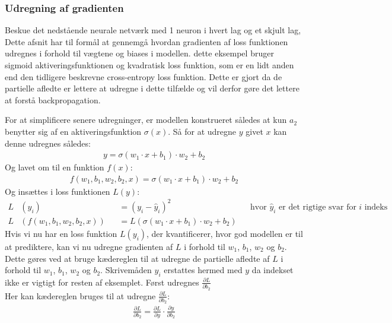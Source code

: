 \documentclass{article}
\begin{document}
\subsubsection{Udregning af gradienten}
Beskue det nedstående neurale netværk med 1 neuron i hvert lag og et skjult lag, Dette afsnit har til formål at gennemgå hvordan gradienten af loss funktionen udregnes i forhold til vægtene og biases i modellen. dette eksempel bruger sigmoid aktiveringsfunktionen og kvadratisk loss funktion, som er en lidt anden end den tidligere beskrevne cross-entropy loss funktion. Dette er gjort da de partielle afledte er lettere at udregne i dette tilfælde og vil derfor gøre det lettere at forstå backpropagation.
\begin{center}
  
  \label{fig:neural_network3}
\end{center}
For at simplificere senere udregninger, er modellen konstrueret således at kun $a_2$ benytter sig af en aktiveringsfunktion $\sigma(x)$. Så for at udregne $y$ givet $x$ kan denne udregnes således:
\begin{align}
  y= \sigma(w_1 \cdot x + b_1) \cdot w_2 + b_2  
\end{align}
Og lavet om til en funktion $f(x)$:
\begin{align}
  f(w_1, b_1, w_2, b_2, x) = \sigma(w_1 \cdot x + b_1) \cdot w_2 + b_2
\end{align}
Og insættes i loss funktionen $L(y)$:
\begin{align}
  L&(y_i) &&= (y_i - \hat{y}_i)^2 && \text{hvor } \hat{y}_i \text{ er det rigtige svar for $i$ indeks}\\
  L&(f(w_1, b_1, w_2, b_2, x)) &&= L(\sigma(w_1 \cdot x + b_1) \cdot w_2 + b_2)
  \label{eq:full_loss}
\end{align}
Hvis vi nu har en loss funktion $L(y_i)$, der kvantificerer, hvor god modellen er til at prediktere, kan vi nu udregne gradienten af $L$ i forhold til $w_1$, $b_1$, $w_2$ og $b_2$. Dette gøres ved at bruge kædereglen til at udregne de partielle afledte af $L$ i forhold til $w_1$, $b_1$, $w_2$ og $b_2$. Skrivemåden $y_i$ erstattes hermed med $y$ da indekset ikke er vigtigt for resten af eksemplet. Først udregnes $\frac{\partial L}{\partial b_2}$\\
Her kan kædereglen bruges til at udregne $\frac{\partial L}{\partial b_2}$:
\begin{align}
  \frac{\partial L}{\partial b_2} = \frac{\partial L}{\partial y} \cdot \frac{\partial y}{\partial b_2}
\end{align}
\end{document}
